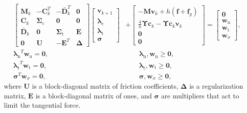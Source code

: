 \documentclass[preprint,12pt]{elsarticle}
\let\vec\bm
\let\mat\mathbf
\numberwithin{equation}{section}
\def\tc{\text{c}}
\def\lambdan{\vec{\lambda}_{\text{n}}}
\def\lambdat{\vec{\lambda}_{\text{t}}}
\newcommand{\complementarityalign}[2]{{#1}^T{#2}=\vec{0}, &\qquad #1, #2 \geq \vec{0}}
\begin{document}
\begin{equation}
    \label{eq:spook_dry}
    \begin{aligned}
        \begin{bmatrix}
            \mat{M}_k       & -\mat{C}_k^T   & -\bar{\mat{D}}_k^T & \mat{0}      \\
            \mat{C}_k       & \mat{\Sigma}_\tc & \mat{0}            & \mat{0}      \\
            \bar{\mat{D}}_k & \mat{0}        & \mat{\Sigma}_\text{t}     & \mat{E}      \\
            \mat{0}         & \mat{U}        & -\mat{E}^T         & \mat{\Delta}
        \end{bmatrix}
        \begin{bmatrix}
            \vec{v}_{k+1} \\
            \vec{\lambda}_\tc      \\
            \lambdat      \\
            \vec{\sigma}
        \end{bmatrix}
         & +
        \begin{bmatrix}
            -\mat{M}\vec{v}_k + h (\vec{f} + \vec{f}_g)                         \\
            \frac{4}{h}\mat{\Upsilon} \vec{c}_k - \mat{\Upsilon} \vec{c}_k \vec{v}_k \\
            \vec{0}                                                                   \\
            \vec{0}
        \end{bmatrix}
        =
        \begin{bmatrix}
            \vec{0}   \\
            \vec{w}_\text{n} \\
            \vec{w}_\text{t} \\
            \vec{w}_\sigma
        \end{bmatrix},                                 \\
        \complementarityalign{\lambdan}{\vec{w}_\text{n}}, \\
        \complementarityalign{\lambdat}{\vec{w}_\text{t}}, \\
        \complementarityalign{\vec{\sigma}}{\vec{w}_\sigma},
    \end{aligned}
\end{equation}
where $\mat{U}$ is a block-diagonal matrix of friction coefficients, $\mat{\Delta}$ is a regularization matrix, $\mat{E}$ is a block-diagonal matrix of ones, and $\vec{\sigma}$ are multipliers that act to limit the tangential force.
\end{document}
